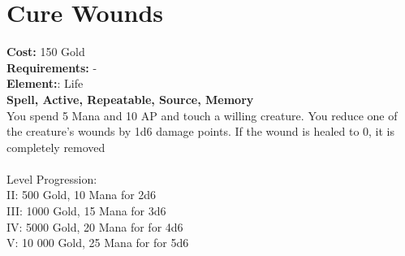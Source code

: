 \section*{Cure Wounds}
\textbf{Cost:} 150 Gold\\
\textbf{Requirements:} -\\
\textbf{Element:}: Life\\
\textbf{Spell, Active, Repeatable, Source, Memory}\\
You spend 5 Mana and 10 AP and touch a willing creature. You reduce one of the creature's wounds by 1d6 damage points. If the wound is healed to 0, it is completely removed\\
\\
Level Progression:\\
II: 500 Gold, 10 Mana for 2d6\\
III: 1000 Gold, 15 Mana for 3d6\\
IV: 5000 Gold, 20 Mana for for 4d6\\
V: 10 000 Gold, 25 Mana for for 5d6\\